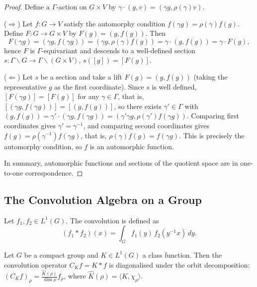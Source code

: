 \begin{proof}
Define a $\Gamma$-action on $G\times V$ by $\gamma\cdot(g,v)=(\gamma g,\rho(\gamma)v)$.

($\Rightarrow$) Let $f:G\to V$ satisfy the automorphy condition $f(\gamma g)=\rho(\gamma)f(g)$. Define $F:G\to G\times V$ by $F(g)=(g,f(g))$. Then
\[
F(\gamma g)=(\gamma g,f(\gamma g))=(\gamma g,\rho(\gamma)f(g))=\gamma\cdot(g,f(g))=\gamma\cdot F(g),
\]
hence $F$ is $\Gamma$-equivariant and descends to a well-defined section $s:\Gamma\backslash G\to\Gamma\backslash(G\times V)$, $s([g])=[F(g)]$.

($\Leftarrow$) Let $s$ be a section and take a lift $F(g)=(g,f(g))$ (taking the representative $g$ as the first coordinate). Since $s$ is well defined, $[F(\gamma g)]=[F(g)]$ for any $\gamma\in\Gamma$, that is, $[(\gamma g,f(\gamma g))]=[(g,f(g))]$, so there exists $\gamma'\in\Gamma$ with $(g,f(g))=\gamma'\cdot(\gamma g,f(\gamma g))=(\gamma'\gamma g,\rho(\gamma')f(\gamma g))$. Comparing first coordinates gives $\gamma'=\gamma^{-1}$, and comparing second coordinates gives $f(g)=\rho(\gamma^{-1})f(\gamma g)$, that is, $\rho(\gamma)f(g)=f(\gamma g)$. This is precisely the automorphy condition, so $f$ is an automorphic function.

In summary, automorphic functions and sections of the quotient space are in one-to-one correspondence.
\end{proof}

\subsection{The Convolution Algebra on a Group}

\begin{definition}
\label{def:group_convolution}
Let $f_1, f_2 \in L^1(G)$. The convolution is defined as
\[
(f_1 * f_2)(x) = \int_G f_1(y)\, f_2(y^{-1}x) \, dy.
\]
\end{definition}

\begin{proposition}\label{prop:convolution_orbit}
Let $G$ be a compact group and $K \in L^1(G)$ a class function. Then the convolution operator $C_K f = K * f$ is diagonalised under the orbit decomposition: $(C_K f)_\rho = \frac{\hat{K}(\rho)}{\dim \rho} f_\rho$, where $\hat{K}(\rho)=\langle K,\chi_\rho\rangle$.
\end{proposition}

